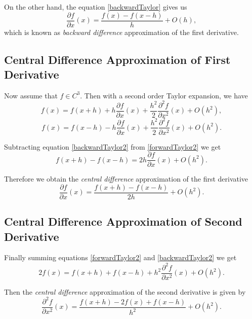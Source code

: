 On the other hand, the equation \eqref{backwardTaylor} gives us
\begin{equation}\label{bwd}
\frac{\partial f}{\partial x}(x) =  \frac{f(x)-f(x-h)}{h} + O(h),
\end{equation}
which is known as \textit{backward difference} approximation of the first derivative.

\subsection{Central Difference Approximation of First Derivative}
Now assume that $f\in C^3$. Then with a second order Taylor expansion, we have
\begin{equation}\label{forwardTaylor2}
f(x) = f(x + h) + h \frac{\partial f}{\partial x}(x) + \frac{h^2}{2}\frac{\partial^2 f}{\partial x^2}(x) +O(h^2),
\end{equation}
\begin{equation}\label{backwardTaylor2}
f(x) = f(x - h) - h \frac{\partial f}{\partial x}(x) + \frac{h^2}{2}\frac{\partial^2 f}{\partial x^2}(x) +O(h^2).
\end{equation}

Subtracting equation \eqref{backwardTaylor2} from  \eqref{forwardTaylor2} we get
$$ f(x+h)-f(x-h) = 2h \frac{\partial f}{\partial x}(x) + O(h^2).$$

Therefore we obtain the \textit{central difference} approximation of the first derivative
\begin{equation}\label{cf1}
\frac{\partial f}{\partial x}(x) = \frac{f(x+h)-f(x-h)}{2h} + O(h^2).
\end{equation}

\subsection{Central Difference Approximation of Second Derivative}
Finally summing equations \eqref{forwardTaylor2} and \eqref{backwardTaylor2} we get
$$2f(x) = f(x+h)+f(x-h)+ h^2 \frac{\partial^2 f}{\partial x^2}(x) + O(h^2).$$ 

Then the \textit{central difference} approximation of the second derivative is given by
\begin{equation}\label{cf2}
\frac{\partial^2 f}{\partial x^2}(x) = \frac{f(x+h)-2f(x)+f(x-h)}{h^2}+O(h^2).
\end{equation}

